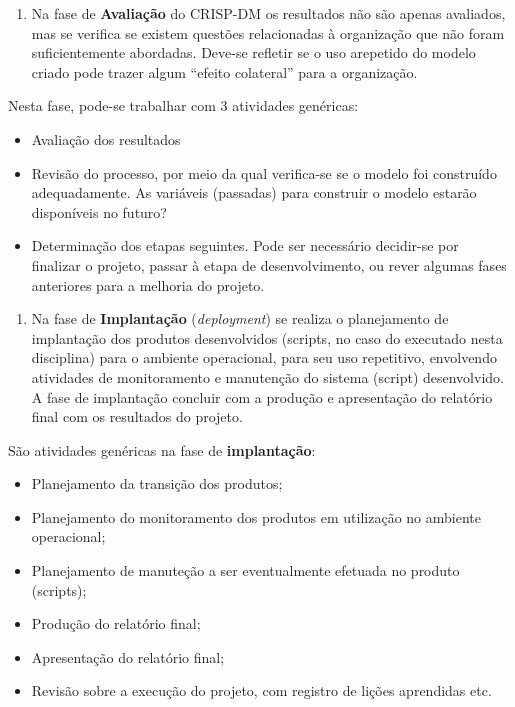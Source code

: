 \documentclass[]{article}
\providecommand{\tightlist}{%
  \setlength{\itemsep}{0pt}\setlength{\parskip}{0pt}}
\begin{document}
\begin{enumerate}
\def\labelenumi{\arabic{enumi}.}
\setcounter{enumi}{4}
\tightlist
\item
  Na fase de \textbf{Avaliação} do CRISP-DM os resultados não são apenas
  avaliados, mas se verifica se existem questões relacionadas à
  organização que não foram suficientemente abordadas. Deve-se refletir
  se o uso arepetido do modelo criado pode trazer algum ``efeito
  colateral'' para a organização.
\end{enumerate}

Nesta fase, pode-se trabalhar com 3 atividades genéricas:

\begin{itemize}
\item
  Avaliação dos resultados
\item
  Revisão do processo, por meio da qual verifica-se se o modelo foi
  construído adequadamente. As variáveis (passadas) para construir o
  modelo estarão disponíveis no futuro?
\item
  Determinação dos etapas seguintes. Pode ser necessário decidir-se por
  finalizar o projeto, passar à etapa de desenvolvimento, ou rever
  algumas fases anteriores para a melhoria do projeto.
\end{itemize}

\begin{enumerate}
\def\labelenumi{\arabic{enumi}.}
\setcounter{enumi}{5}
\tightlist
\item
  Na fase de \textbf{Implantação} (\emph{deployment}) se realiza o
  planejamento de implantação dos produtos desenvolvidos (scripts, no
  caso do executado nesta disciplina) para o ambiente operacional, para
  seu uso repetitivo, envolvendo atividades de monitoramento e
  manutenção do sistema (script) desenvolvido. A fase de implantação
  concluir com a produção e apresentação do relatório final com os
  resultados do projeto.
\end{enumerate}

São atividades genéricas na fase de \textbf{implantação}:

\begin{itemize}
\tightlist
\item
  Planejamento da transição dos produtos;
\item
  Planejamento do monitoramento dos produtos em utilização no ambiente
  operacional;
\item
  Planejamento de manuteção a ser eventualmente efetuada no produto
  (scripts);
\item
  Produção do relatório final;
\item
  Apresentação do relatório final;
\item
  Revisão sobre a execução do projeto, com registro de lições aprendidas
  etc.
\end{itemize}
\end{document}
